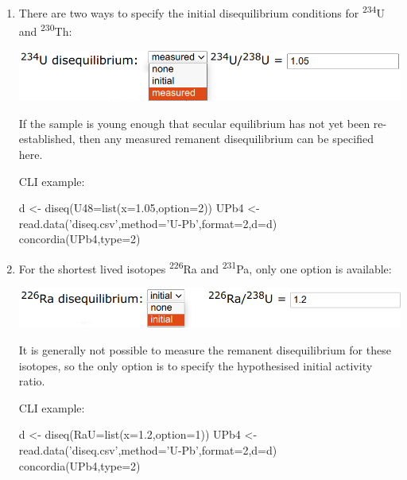 \begin{refsection}
\begin{enumerate}
\begin{enumerate}

\item There are two ways to specify the initial disequilibrium
  conditions for \textsuperscript{234}U and \textsuperscript{230}Th:
  
\noindent\begin{minipage}[t]{.6\linewidth}
  \strut\vspace*{-\baselineskip}\newline
  \includegraphics[width=\linewidth]{../figures/U234-disequilibrium.png}
  \end{minipage}
  \begin{minipage}[t]{.4\linewidth}
If the sample is young enough that secular equilibrium has not yet
been re-established, then any measured remanent disequilibrium can be
specified here.
  \end{minipage}

\noindent CLI example:
\begin{script}
d <- diseq(U48=list(x=1.05,option=2))
UPb4 <- read.data('diseq.csv',method='U-Pb',format=2,d=d)
concordia(UPb4,type=2)
\end{script}

\item For the shortest lived isotopes \textsuperscript{226}Ra and
  \textsuperscript{231}Pa, only one option is available:
  
\noindent\begin{minipage}[t]{.6\linewidth}
  \strut\vspace*{-\baselineskip}\newline
  \includegraphics[width=\linewidth]{../figures/Ra226-disequilibrium.png}
\end{minipage}
\begin{minipage}[t]{.4\linewidth}
It is generally not possible to measure the remanent disequilibrium
for these isotopes, so the only option is to specify the hypothesised
initial activity ratio.
\end{minipage}

\noindent CLI example:
\begin{script}
d <- diseq(RaU=list(x=1.2,option=1))
UPb4 <- read.data('diseq.csv',method='U-Pb',format=2,d=d)
concordia(UPb4,type=2)
\end{script}


\end{enumerate}
\end{enumerate}
\end{refsection}
